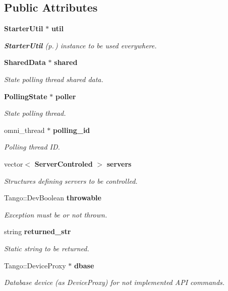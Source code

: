 \subsection*{Public Attributes}
\begin{CompactItemize}
\item 
{\bf Starter\-Util} $\ast$ {\bf util}
\begin{CompactList}\small\item\em {\bf Starter\-Util} {\rm (p.\,\pageref{classStarter_1_1StarterUtil})} instance to be used everywhere.\item\end{CompactList}\item 
{\bf Shared\-Data} $\ast$ {\bf shared}
\begin{CompactList}\small\item\em State polling thread shared data.\item\end{CompactList}\item 
{\bf Polling\-State} $\ast$ {\bf poller}
\begin{CompactList}\small\item\em State polling thread.\item\end{CompactList}\item 
omni\_\-thread $\ast$ {\bf polling\_\-id}
\begin{CompactList}\small\item\em Polling thread ID.\item\end{CompactList}\item 
vector$<$ {\bf Server\-Controled} $>$ {\bf servers}
\begin{CompactList}\small\item\em Structures defining servers to be controlled.\item\end{CompactList}\item 
Tango::Dev\-Boolean {\bf throwable}
\begin{CompactList}\small\item\em Exception must be or not thrown.\item\end{CompactList}\item 
string {\bf returned\_\-str}
\begin{CompactList}\small\item\em Static string to be returned.\item\end{CompactList}\item 
Tango::Device\-Proxy $\ast$ {\bf dbase}
\begin{CompactList}\small\item\em Database device (as Device\-Proxy) for not implemented API commands.\item\end{CompactList}\end{CompactItemize}
